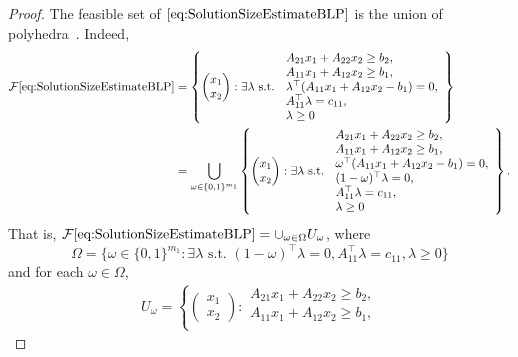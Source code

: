 \documentclass[runningheads,orivec]{llncs}
\newcommand{\MacroColor}[1]{#1}
\newcommand{\NConstraints}{\MacroColor{m}}
\newcommand{\FeasSolSet}{\MacroColor{\mathcal{F}}}
\begin{document}
\begin{appendix}
\begin{proof}
The feasible set of $\eqref{eq:SolutionSizeEstimateBLP}$ is the union of polyhedra~\cite{BasuEtAl2021}.
Indeed,
\begin{align*}
\FeasSolSet\eqref{eq:SolutionSizeEstimateBLP}
&=
\left\{
\begin{pmatrix}
x_1 \\ x_2
\end{pmatrix}
:
\exists \lambda \text{ s.t. }
\begin{array}{l}
A_{2 1} x_1 + A_{2 2} x_2 \ge b_2, \\
A_{1 1} x_1 + A_{1 2} x_2 \ge b_1, \\
\lambda^{\top} ( A_{1 1} x_1 + A_{1 2} x_2 - b_1) = 0, \\
A_{1 1}^{\top} \lambda = c_{1 1}, \\
\lambda \ge 0
\end{array}
\right\}
\\
&=
\bigcup_{\omega \in \{0, 1\}^{\NConstraints_1}}
\left\{
\begin{pmatrix}
x_1 \\ x_2
\end{pmatrix}
:
\exists \lambda \text{ s.t. }
\begin{array}{l}
A_{2 1} x_1 + A_{2 2} x_2 \ge b_2, \\
A_{1 1} x_1 + A_{1 2} x_2 \ge b_1, \\
\omega^{\top} ( A_{1 1} x_1 + A_{1 2} x_2 - b_1) = 0, \\
(1 - \omega)^{\top} \lambda = 0, \\
A_{1 1}^{\top} \lambda = c_{1 1}, \\
\lambda \ge 0
\end{array}
\right\}.
\end{align*}
That is, $\FeasSolSet\eqref{eq:SolutionSizeEstimateBLP} = \cup_{\omega \in \Omega} U_{\omega}$, where
$$
\Omega = \{
\omega \in \{0, 1\}^{\NConstraints_1} : \exists \lambda \text{ s.t. } 
(1 - \omega)^{\top} \lambda = 0, 
A_{1 1}^{\top} \lambda = c_{1 1}, 
\lambda \ge 0
\}
$$
and for each $\omega \in \Omega$,
\begin{align*}
U_{\omega} =
\left\{
\begin{pmatrix}
x_1 \\ x_2
\end{pmatrix}
:
\begin{array}{l}
A_{2 1} x_1 + A_{2 2} x_2 \ge b_2, \\
A_{1 1} x_1 + A_{1 2} x_2 \ge b_1, \\

\end{array}
\end{align*}
\end{proof}
\end{appendix}
\end{document}
